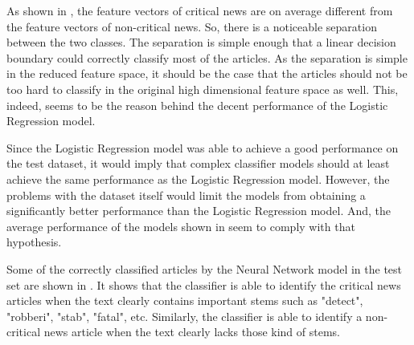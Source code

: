 As shown in , the feature vectors of critical news are on average different from the feature vectors of non-critical news. So, there is a noticeable separation between the two classes. The separation is simple enough that a linear decision boundary could correctly classify most of the articles. As the separation is simple in the reduced feature space, it should be the case that the articles should not be too hard to classify in the original high dimensional feature space as well. This, indeed, seems to be the reason behind the decent performance of the Logistic Regression model.

Since the Logistic Regression model was able to achieve a good performance on the test dataset, it would imply that complex classifier models should at least achieve the same performance as the Logistic Regression model. However, the problems with the dataset itself would limit the models from obtaining a significantly better performance than the Logistic Regression model. And, the average performance of the models shown in  seem to comply with that hypothesis.

Some of the correctly classified articles by the Neural Network model in the test set are shown in . It shows that the classifier is able to identify the critical news articles when the text clearly contains important stems such as "detect", "robberi", "stab", "fatal", etc. Similarly, the classifier is able to identify a non-critical news article when the text clearly lacks those kind of stems.

